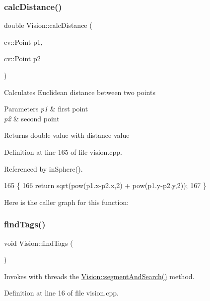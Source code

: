 \subsubsection{\texorpdfstring{calc\+Distance()}{calcDistance()}}
{\footnotesize\ttfamily double Vision\+::calc\+Distance (\begin{DoxyParamCaption}\item[{cv\+::\+Point}]{p1,  }\item[{cv\+::\+Point}]{p2 }\end{DoxyParamCaption})}

Calculates Euclidean distance between two points 
\begin{DoxyParams}{Parameters}
{\em p1} & first point \\
\hline
{\em p2} & second point \\
\hline
\end{DoxyParams}
\begin{DoxyReturn}{Returns}
double value with distance value 
\end{DoxyReturn}


Definition at line 165 of file vision.\+cpp.



Referenced by in\+Sphere().


\begin{DoxyCode}
165                                                   \{
166     \textcolor{keywordflow}{return} sqrt(pow(p1.x-p2.x,2) + pow(p1.y-p2.y,2));
167 \}
\end{DoxyCode}
Here is the caller graph for this function\+:
\mbox{\label{class_vision_a7321350b5ea7648219a4cd4f0f7ca48e}} 
\subsubsection{\texorpdfstring{find\+Tags()}{findTags()}}
{\footnotesize\ttfamily void Vision\+::find\+Tags (\begin{DoxyParamCaption}{ }\end{DoxyParamCaption})\hspace{0.3cm}{\ttfamily [private]}}

Invokes with threads the \hyperlink{class_vision_a0e43481439b4b670f5dd66caefa09494}{Vision\+::segment\+And\+Search()} method. 

Definition at line 16 of file vision.\+cpp.



